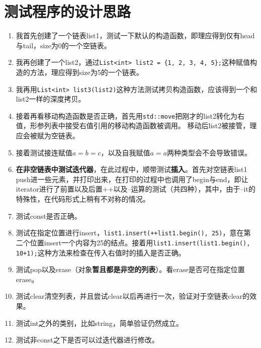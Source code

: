 \documentclass[UTF8]{ctexart}
\begin{document}
\pagestyle{fancy}
\fancyhead{}

\section{测试程序的设计思路}



\begin{enumerate}

    \item 我首先创建了一个链表list1，测试一下默认的构造函数，即理应得到仅有head与tail，size为0的一个空链表。

    \item  我再创建了一个list2，通过\texttt{List<int> list2 = \{1, 2, 3, 4, 5\};}这种赋值构造的方法，理应得到size为5的一个链表。

    \item 我再用\texttt{List<int> list3(list2)}这种方法测试拷贝构造函数，应该得到一个和list2一样的深度拷贝。

    \item 接着再看移动构造函数是否正确，首先用\texttt{std::move}把刚才的list2转化为右值，形参列表中接受右值引用的移动构造函数被调用。
    移动后list2被接管，理应会被赋为空链表。

    \item 接着测试接连赋值$a=b=c$，以及自我赋值$a=a$两种类型会不会导致错误。

    \item \textbf{在非空链表中测试迭代器}，在此过程中，顺带测试\textbf{插入}。首先对空链表list1 push进一些元素，并打印出来，在打印的过程中也调用了begin与end，即让iterator进行了前置以及后置++以及--运算的测试（共四种），其中，由于--it的特殊性，在代码形式上稍有不对称的情况。

    \item 测试const是否正确。

    \item 测试在指定位置进行insert，\texttt{list1.insert(++list1.begin(), 25)}，意在第二个位置insert一个内容为25的结点。接着用\texttt{list1.insert(list1.begin(), 10+1);}这种方法来检查在传入右值时的插入是否正确。

    \item 测试pop以及erase（对象\textbf{暂且都是非空的列表}）。看erase是否可在指定位置erase。

    \item 测试clear清空列表，并且尝试clear以后再进行一次，验证对于空链表clear的效果。

    \item 测试int之外的类别，比如string，简单验证仍然成立。

    \item 测试非const之下是否可以过迭代器进行修改。

\end{enumerate}
\end{document}
